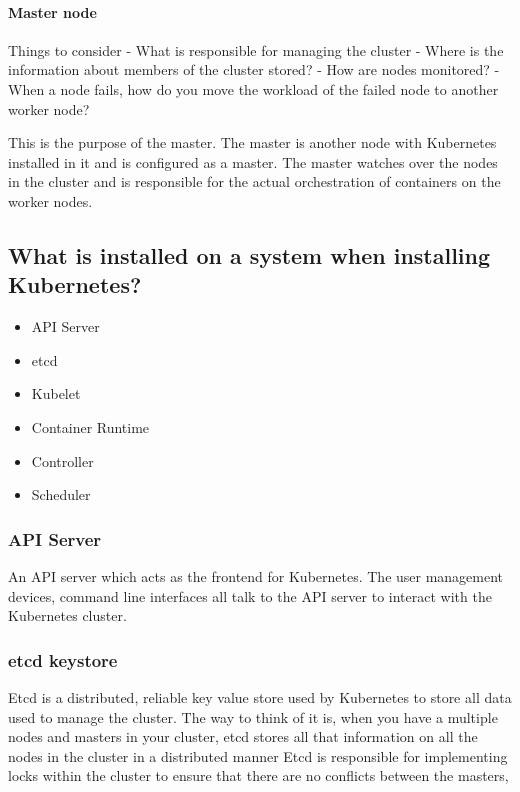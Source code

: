 \documentclass[11pt]{book}
\begin{document}
    \paragraph{Master node}
    Things to consider
    - What is responsible for managing the cluster
    - Where is the information about members of the cluster stored?
    - How are nodes monitored?
    - When a node fails, how do you move the workload of the failed node to another worker node?

    This is the purpose of the master.
    The master is another node with Kubernetes installed in it and is configured as a master.
    The master watches over the nodes in the cluster and is responsible for the actual orchestration of containers on the worker nodes.

    \subsection{What is installed on a system when installing Kubernetes?}
    \begin{itemize}
        \item API Server
        \item etcd
        \item Kubelet
        \item Container Runtime
        \item Controller
        \item Scheduler
    \end{itemize}

    \subsubsection{API Server}
    An API server which acts as the frontend for Kubernetes.
    The user management devices, command line interfaces all talk to the API server to interact with the Kubernetes cluster.

    \subsubsection{etcd keystore}
    Etcd is a distributed, reliable key value store used by Kubernetes to store all data used to manage the cluster.
    The way to think of it is, when you have a multiple nodes and masters in your cluster, etcd stores all that information on all the nodes in the cluster in a distributed manner
    Etcd is responsible for implementing locks within the cluster to ensure that there are no conflicts between the masters,
\end{document}
